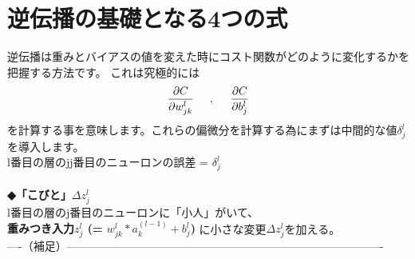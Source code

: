 \documentclass[11pt,a4paper,fleqn]{jsarticle}
\begin{document}
\section{逆伝播の基礎となる4つの式}
逆伝播は重みとバイアスの値を変えた時にコスト関数がどのように変化するかを把握する方法です。 これは究極的には\\
\begin{eqnarray}
 \frac{\partial C}{\partial w^l_{jk}} \nonumber \hspace{5mm},\hspace{5mm}%
\frac{\partial C}{\partial b^l_j}  \nonumber %
\end{eqnarray}
を計算する事を意味します。これらの偏微分を計算する為にまずは中間的な値$\delta^l_j$を導入します。\\
l番目の層のjj番目のニューロンの誤差 = $\delta^l_j$ \\
\\
{\Large \bf ◆「こびと」$\Delta z^l_j$　} \\
l番目の層のj番目のニューロンに「小人」がいて、\\
{\Large \bf 重みつき入力$z^l_j$ (= $w^l_{jk} * a^{(l-1)}_k + b^l_j$) }に小さな変更$\Delta z^l_j$を加える。\\
----（補足）-------------------------------------------------------------------------------------\\
\end{document}
